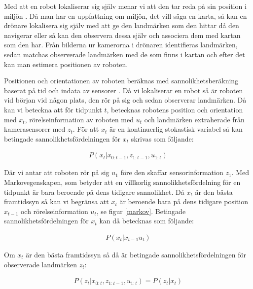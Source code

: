 Med att en robot lokaliserar sig själv menar vi att den tar reda på sin position i miljön \citep{982903}. Då man har en uppfattning om miljön, det vill säga en karta, så kan en drönare lokalisera sig själv med att ge den landmärken som den hittar då den navigerar eller så kan den observera dessa själv och associera dem med kartan som den har. Från bilderna ur kamerorna i drönaren identifieras landmärken, sedan matchas observerade landmärken med de som finns i kartan och efter det kan man estimera positionen av roboten.

Positionen och orientationen av roboten beräknas med sannolikhetsberäkning baserat på tid och indata av sensorer \citep{ProbabilisticRobotics}. Då vi lokaliserar en robot så är roboten vid början vid någon plats, den rör på sig och sedan observerar landmärken. Då kan vi beteckna att för tidpunkt $t$, betecknas robotens position och orientation med $x_t$, rörelseinformation av roboten med $u_t$ och landmärken extraherade från kamerasensorer med $z_t$. För att $x_t$ är en kontinuerlig stokastisk variabel så kan betingade sannolikhetsfördelningen för $x_t$ skrivas som följande:

\begin{align}
    P(x_t | x_{0:t-1}, z_{1:t-1}, u_{1:t})
\end{align}

Där vi antar att roboten rör på sig $u_1$ före den skaffar sensorinformation $z_1$. Med Markovegenskapen, som betyder att en villkorlig sannolikhetsfördelning för en tidpunkt är bara beroende på dens tidigare sannolikhet. Då $x_t$ är den bästa framtidssyn så kan vi begränsa att $x_t$ är beroende bara på dens tidigare position $x_{t-1}$ och rörelseinformation $u_t$, se figur \ref{markov}. Betingade sannolikhetsfördelningen för $x_t$ kan då betecknas som följande:

\begin{align}
    P(x_t | x_{t-1} u_{t})
\end{align}

Om $x_t$ är den bästa framtidssyn så då är betingade sannolikhetsfördelningen för observerade landmärken $z_t$:

\begin{align}
    P(z_t | x_{0:t}, z_{1:t-1}, u_{1:t}) = P(z_t|x_t)
\end{align}

